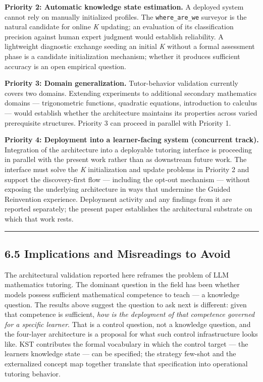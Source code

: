 \documentclass[
]{article}
\begin{document}
\textbf{Priority 2: Automatic knowledge state estimation.} A deployed system cannot rely on manually initialized profiles. The \texttt{where\_are\_we} surveyor is the natural candidate for online \emph{K} updating; an evaluation of its classification precision against human expert judgment would establish reliability. A lightweight diagnostic exchange seeding an initial \emph{K} without a formal assessment phase is a candidate initialization mechanism; whether it produces sufficient accuracy is an open empirical question.

\textbf{Priority 3: Domain generalization.} Tutor-behavior validation currently covers two domains. Extending experiments to additional secondary mathematics domains --- trigonometric functions, quadratic equations, introduction to calculus --- would establish whether the architecture maintains its properties across varied prerequisite structures. Priority 3 can proceed in parallel with Priority 1.

\textbf{Priority 4: Deployment into a learner-facing system (concurrent track).} Integration of the architecture into a deployable tutoring interface is proceeding in parallel with the present work rather than as downstream future work. The interface must solve the \emph{K} initialization and update problems in Priority 2 and support the discovery-first flow --- including the opt-out mechanism --- without exposing the underlying architecture in ways that undermine the Guided Reinvention experience. Deployment activity and any findings from it are reported separately; the present paper establishes the architectural substrate on which that work rests.

\begin{center}\rule{0.5\linewidth}{0.5pt}\end{center}

\subsection{6.5 Implications and Misreadings to Avoid}\label{65-implications-and-misreadings-to-avoid}

The architectural validation reported here reframes the problem of LLM mathematics tutoring. The dominant question in the field has been whether models possess sufficient mathematical competence to teach --- a knowledge question. The results above suggest the question to ask next is different: given that competence is sufficient, \emph{how is the deployment of that competence governed for a specific learner}. That is a control question, not a knowledge question, and the four-layer architecture is a proposal for what such control infrastructure looks like. KST contributes the formal vocabulary in which the control target --- the learner\textquotesingle s knowledge state --- can be specified; the strategy few-shot and the externalized concept map together translate that specification into operational tutoring behavior.
\end{document}
